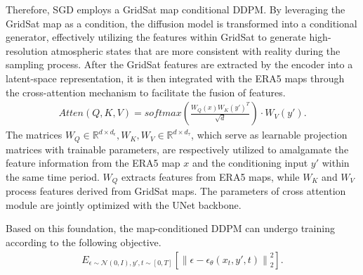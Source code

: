 Therefore, SGD employs a GridSat map conditional DDPM. 
By leveraging the GridSat map as a condition, the diffusion model is transformed into a conditional generator, effectively utilizing the features within GridSat to generate high-resolution atmospheric states that are more consistent with reality during the sampling process. 
After the GridSat features are extracted by the encoder into a latent-space representation, it is then integrated with the ERA5 maps through the cross-attention mechanism to facilitate the fusion of features.
\begin{align}
Atten(Q,K,V)=softmax(\frac{W_Q(x)W_K(y')^T}{\sqrt{d}})\cdot W_V(y').
\end{align}
The matrices $W_Q\in \mathbb{R}^{d\times d_{\epsilon}}, W_K, W_V\in \mathbb{R}^{d\times d_{\tau}}$, which serve as learnable projection matrices with trainable parameters, are respectively utilized to amalgamate the feature information from the ERA5 map $x$ and the conditioning input $y'$ within the same time period. 
$W_Q$ extracts features from ERA5 maps, while $W_K$ and $W_V$ process features derived from GridSat maps. 
The parameters of cross attention module are jointly optimized with the UNet backbone.

Based on this foundation, the map-conditioned DDPM can undergo training according to the following objective.
\begin{align}
E_{\epsilon \sim \mathcal{N}(0,I),y',t\sim [0,T]}[\left \|\epsilon - \epsilon_\theta(x_t,y',t) \right \|^2_2 ].
\end{align}

